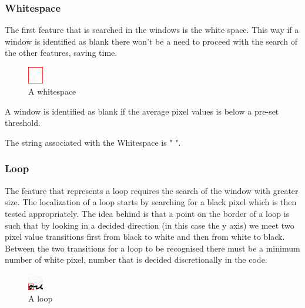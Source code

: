 \subsubsection{Whitespace}  

The first feature that is searched in the windows is the white space. This way if a window is identified as blank there won't be a need to proceed with the search of the other features, saving time.

\begin{figure}[!ht]
\centering
\includegraphics[width=0.06\textwidth]{images/whitespace.jpg}
\caption{A whitespace}
\end{figure} 

A window is identified as blank if the average pixel values is below a pre-set threshold.

The string associated with the Whitespace is " ".

\subsubsection{Loop}

The feature that represents a loop requires the search of the window with greater size.
The localization of a loop starts by searching for a black pixel which is then tested appropriately. The idea behind is that a point on the border of a loop is such that by looking in a decided direction (in this case the y axis) we meet two pixel value transitions first from black to white and then from white to black. Between the two transitions for a loop to be recognised there must be a minimum number of white pixel, number that is decided discretionally in the code.

\begin{figure}
  \vspace{-20pt}
  \begin{center}
    \includegraphics[width=0.06\textwidth]{images/loop.jpg}
  \end{center}
  \vspace{-20pt}
  \caption{A loop}
  \vspace{-10pt}
\end{figure}


